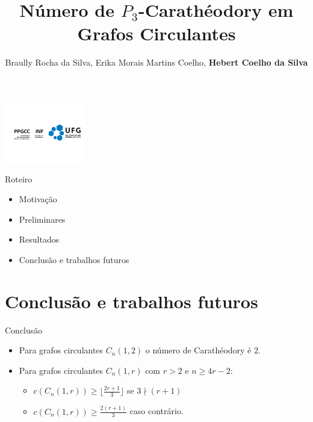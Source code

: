 \documentclass{beamer}
\title{Número de $P_3$-Carathéodory em Grafos Circulantes}
\author{Braully Rocha da Silva, Erika Morais Martins Coelho, {\bf Hebert Coelho da Silva}}
\institute{Universidade Federal de Goiás \par Instituto de Informática}
\begin{document}
\begin{frame}
  \titlepage
  \centering
  \includegraphics[width=3.5cm]{img/logo-ppgc.png}
\end{frame}

\begin{frame}{Roteiro}
  \begin{itemize}
    \item Motivação
    \item Preliminares
    \item Resultados
    \item Conclusão e trabalhos futuros
  \end{itemize}
\end{frame}



% 




\section{Conclusão e trabalhos futuros}
\begin{frame}{Conclusão}
  \begin{itemize}
    \item Para grafos circulantes $C_n(1,2)$ o número de Carathéodory é 2.
    \item Para grafos circulantes $C_n(1,r)$ com $r>2$ e $n\ge4r-2$:
          \begin{itemize}
            \item $c(C_n(1,r)) \ge \lfloor \frac{2r+1}{3} \rfloor$ se $3 \nmid (r+1)$
            \item $c(C_n(1,r)) \ge \frac{2(r+1)}{3} $ caso contrário.
          \end{itemize}
  \end{itemize}
\end{frame}
\end{document}
